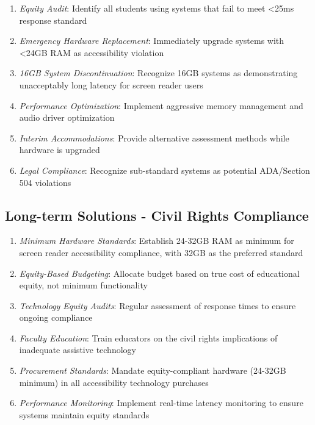 \begin{enumerate}
\item \emph{Equity Audit}: Identify all students using systems that fail to meet <25ms response standard \cite{EducationalEquityReport2024}
\item \emph{Emergency Hardware Replacement}: Immediately upgrade systems with <24GB RAM as accessibility violation \cite{ADA1990, Section504RehabAct}
\item \emph{16GB System Discontinuation}: Recognize 16GB systems as demonstrating unacceptably long latency for screen reader users \cite{EducationalEquityReport2024}
\item \emph{Performance Optimization}: Implement aggressive memory management and audio driver optimization \cite{SystemOptimizationGuides}
\item \emph{Interim Accommodations}: Provide alternative assessment methods while hardware is upgraded \cite{AccommodationsBestPractices}
\item \emph{Legal Compliance}: Recognize sub-standard systems as potential ADA/Section 504 violations \cite{ADA1990, Section504RehabAct}
\end{enumerate}

\subsection{Long-term Solutions - Civil Rights Compliance}\label{long-term-solutions-civil-rights-compliance}

\begin{enumerate}
\item \emph{Minimum Hardware Standards}: Establish 24-32GB RAM as minimum for screen reader accessibility compliance, with 32GB as the preferred standard \cite{EducationalEquityReport2024}
\item \emph{Equity-Based Budgeting}: Allocate budget based on true cost of educational equity, not minimum functionality \cite{EquityInFundingEducation}
\item \emph{Technology Equity Audits}: Regular assessment of response times to ensure ongoing compliance \cite{TechnologyAccessibilityAudits}
\item \emph{Faculty Education}: Train educators on the civil rights implications of inadequate assistive technology \cite{AccessibilityTrainingEducation}
\item \emph{Procurement Standards}: Mandate equity-compliant hardware (24-32GB minimum) in all accessibility technology purchases \cite{AccessibleProcurementGuidelines}
\item \emph{Performance Monitoring}: Implement real-time latency monitoring to ensure systems maintain equity standards \cite{SystemPerformanceMonitoring}
\end{enumerate}

